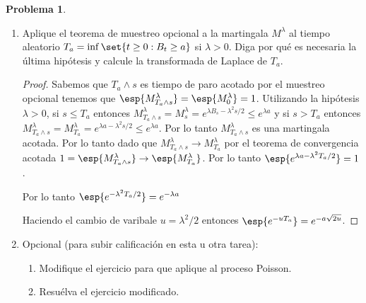 \documentclass[a5paper,oneside]{amsart}
\theoremstyle{plain}
\theoremstyle{definition}
\newtheorem{problema}{Problema}
\begin{document}
\begin{problema}
\begin{enumerate}
\begin{proof}
\end{proof}
\item Aplique el teorema de muestreo opcional a la martingala $M^\lambda $ al tiempo aleatorio $T_a=\inf\set{t\geq 0:B_t\geq a}$ si $\lambda>0$. Diga por qu\'e es necesaria la \'ultima hip\'otesis y calcule la transformada de Laplace de $T_a$.
\begin{proof}
Sabemos que $T_a\wedge s$ es tiempo de paro acotado por el muestreo opcional tenemos que $\esp{M_{T_a\wedge s}^\lambda}=\esp{M_0^\lambda}=1$. Utilizando la hip\'otesis $\lambda>0$, si $s\leq T_a$ entonces $M_{T_a\wedge s}^{\lambda}=M_s^{\lambda}=e^{\lambda B_s-\lambda^2s/2} \leq e^{\lambda a}$  y si $s > T_a$ entonces $M_{T_a\wedge s}^{\lambda}=M_{T_a}^{\lambda}=e^{\lambda a -\lambda^2s/2} \leq e^{\lambda a}$. Por lo tanto $M_{T_a\wedge s}^{\lambda}$  es una martingala acotada. Por lo tanto dado que  $M_{T_a\wedge s}^{\lambda} \rightarrow M_{T_a}^{\lambda}$ por el teorema de convergencia acotada $1=\esp{M_{T_a\wedge s}^\lambda}\rightarrow \esp{M_{T_a}^{\lambda}}$.
Por lo tanto $\esp{e^{\lambda a-\lambda^2T_a/2} }=1$.

Por lo tanto $\esp{e^{-\lambda^2T_a/2}}=e^{-\lambda a}$

Haciendo el cambio de varibale $u=\lambda^2/2$ entonces $\esp{e^{-uT_a}}=e^{- a\sqrt{2u}}$.
\end{proof}

\item Opcional (para subir calificaci\'on en esta u otra tarea): 
\begin{enumerate}
\item Modifique el ejercicio para que aplique al proceso Poisson.
\item Resu\'elva el ejercicio modificado. 
\end{enumerate}
\end{enumerate}
\end{problema}
\end{document}
